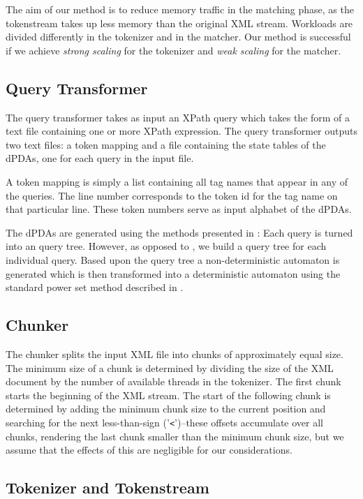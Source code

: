 The aim of our method is to reduce memory traffic in the matching phase, as the
tokenstream takes up less memory than the original XML stream. Workloads are
divided differently in the tokenizer and in the matcher. Our method is
successful if we achieve \emph{strong scaling} for the tokenizer and \emph{weak
scaling} for the matcher.

\subsection{Query Transformer}

The query transformer takes as input an XPath query which takes the form of a
text file containing one or more XPath expression. The query transformer outputs
two text files: a token mapping and a file containing the state tables of
the dPDAs, one for each query in the input file.

A token mapping is simply a list containing all tag names that appear in any of
the queries. The line number corresponds to the token id for the tag
name on that particular line. These token numbers serve as input alphabet of
the dPDAs.

The dPDAs are generated using the methods presented in \cite{Green2004}: Each
query is turned into an query tree. However, as opposed to
\cite{Green2004}, we build a query tree for each individual query.
Based upon the query tree a non-deterministic automaton is generated which is
then transformed into a deterministic automaton using the standard power set
method described in \cite{Hopcroft2006}.

\subsection{Chunker}

The chunker splits the input XML file into chunks of approximately equal size.
The minimum size of a chunk is determined by dividing the size of the XML
document by the number of available threads in the tokenizer. The first chunk
starts the beginning of the XML stream. The start of the following chunk is
determined by adding the minimum chunk size to the current position and
searching for the next less-than-sign ('\texttt{<}')–these offsets accumulate
over all chunks, rendering the last chunk smaller than the minimum chunk size,
but we assume that the effects of this are negligible for our considerations.

\subsection{Tokenizer and Tokenstream}

